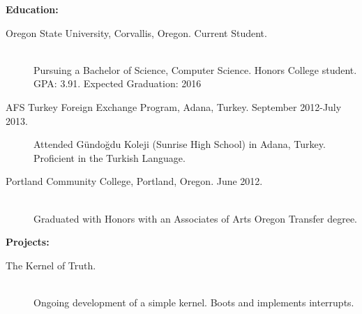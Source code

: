 \documentclass[11pt]{article}
\begin{document}
\bigskip

{\Large \bf Education:}
\begin{description}
	\item[Oregon State University, Corvallis, Oregon.
		\hfill Current Student.]
		\hfill \\
		Pursuing a Bachelor of Science, Computer Science. 
		Honors College student. GPA: 3.91. Expected Graduation: 2016
		
	\item[AFS Turkey Foreign Exchange Program, Adana, Turkey. 
		\hfill September 2012-July 2013.]
		Attended Gündoğdu Koleji (Sunrise High School) in Adana, 
		Turkey. Proficient in the Turkish Language.

	\item[Portland Community College, Portland, Oregon.
		\hfill June 2012.]
		\hfill \\
		Graduated with Honors with an Associates of Arts 
		Oregon Transfer degree.

\end{description}

\bigskip

{\Large \bf Projects:}
\begin{description}
	\item[The Kernel of Truth.]
		\hfill \\
		Ongoing development of a simple kernel. Boots and implements
		interrupts.

\end{description}
\end{document}
